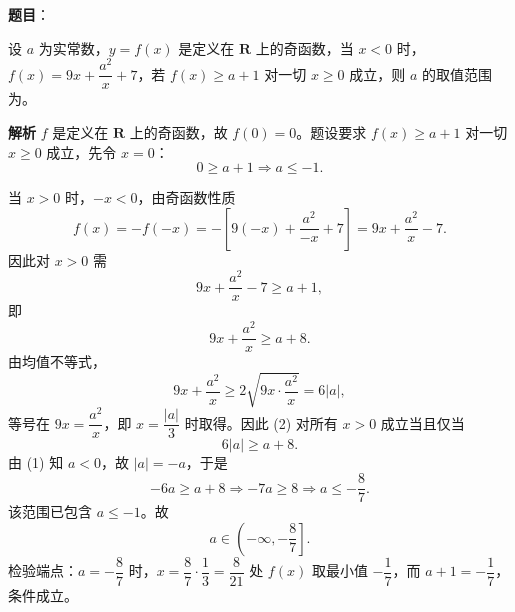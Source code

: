 \begin{answer}

\textbf{题目}：

设 $a$ 为实常数，$y=f(x)$ 是定义在 $\mathbf R$ 上的奇函数，当 $x<0$ 时，$f(x)=9x+\dfrac{a^2}{x}+7$，若 $f(x)\geqslant a+1$ 对一切 $x\geqslant0$ 成立，则 $a$ 的取值范围为\gkblank{}。

\textbf{解析}
$f$ 是定义在 $\mathbf R$ 上的奇函数，故 $f(0)=0$。题设要求 $f(x)\geqslant a+1$ 对一切 $x\geqslant0$ 成立，先令 $x=0$：
\nopagebreak[4]
\[0\geqslant a+1\Longrightarrow a\leqslant-1. \tag{1}\]

当 $x>0$ 时，$-x<0$，由奇函数性质
\nopagebreak[4]
\[f(x)=-f(-x)
=-\left[9(-x)+\frac{a^2}{-x}+7\right]
=9x+\frac{a^2}{x}-7.\]
因此对 $x>0$ 需
\nopagebreak[4]
\[9x+\frac{a^2}{x}-7\geqslant a+1,\]
即
\nopagebreak[4]
\[9x+\frac{a^2}{x}\geqslant a+8. \tag{2}\]
由均值不等式，
\nopagebreak[4]
\[9x+\frac{a^2}{x}\geqslant2\sqrt{9x\cdot\frac{a^2}{x}}=6|a|,\]
等号在 $9x=\dfrac{a^2}{x}$，即 $x=\dfrac{|a|}{3}$ 时取得。因此 (2) 对所有 $x>0$ 成立当且仅当
\nopagebreak[4]
\[6|a|\geqslant a+8.\]
由 (1) 知 $a<0$，故 $|a|=-a$，于是
\nopagebreak[4]
\[-6a\geqslant a+8\Longrightarrow -7a\geqslant8\Longrightarrow a\leqslant-\frac87.\]
该范围已包含 $a\leqslant-1$。故
\nopagebreak[4]
\[a\in\left(-\infty,-\frac87\right].\]
检验端点：$a=-\dfrac87$ 时，$x=\dfrac87\cdot\dfrac13=\dfrac{8}{21}$ 处 $f(x)$ 取最小值 $-\dfrac17$，而 $a+1=-\dfrac17$，条件成立。

\gkanswer{答案：$\left(-\infty,-\dfrac87\right]$。$x>0$ 时 $f(x)=9x+\dfrac{a^2}{x}-7$，其最小值 $6|a|-7$ 需不小于 $a+1$，结合 $f(0)=0\geqslant a+1$ 得 $a\leqslant-\dfrac87$。}

\end{answer}
